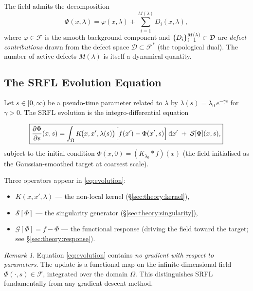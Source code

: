\documentclass[12pt,a4paper]{article}
\theoremstyle{plain}
\theoremstyle{definition}
\theoremstyle{remark}
\newtheorem{remark}[theorem]{Remark}
\newcommand{\cF}{\mathcal{F}}
\newcommand{\cD}{\mathcal{D}}
\newcommand{\cG}{\mathcal{G}}
\newcommand{\cS}{\mathcal{S}}
\newcommand{\dd}{\mathrm{d}}
\newcommand{\parti}[2]{\frac{\partial #1}{\partial #2}}
\DeclarePairedDelimiter{\set}{\{}{\}}
\begin{document}
The field admits the decomposition
\begin{equation}
  \Phi(x,\lambda) = \varphi(x,\lambda) + \sum_{i=1}^{M(\lambda)} D_i(x,\lambda),
  \label{eq:decomp}
\end{equation}
where $\varphi \in \cF$ is the smooth background component and
$\set{D_i}_{i=1}^{M(\lambda)} \subset \cD$ are \emph{defect contributions}
drawn from the defect space $\cD \subset \cF^*$ (the topological dual).
The number of active defects $M(\lambda)$ is itself a dynamical quantity.

\subsection{The SRFL Evolution Equation}
\label{sec:theory:evolution}

Let $s \in [0,\infty)$ be a pseudo-time parameter related to $\lambda$
by $\lambda(s) = \lambda_0\,e^{-\gamma s}$ for $\gamma > 0$.  The SRFL
evolution is the integro-differential equation

\begin{equation}
  \boxed{%
    \parti{\Phi}{s}(x,s)
    = \int_\Omega K\!\bigl(x,x',\lambda(s)\bigr)
      \Bigl[f(x') - \Phi(x',s)\Bigr]\,\dd x'
    \;+\; \cS[\Phi](x,s),
  }
  \label{eq:evolution}
\end{equation}
subject to the initial condition
$\Phi(x,0) = (K_{\lambda_0} * f)(x)$
(the field initialised as the Gaussian-smoothed target at coarsest scale).

Three operators appear in \eqref{eq:evolution}:

\begin{itemize}
  \item $K(x,x',\lambda)$ — the non-local kernel (\S\ref{sec:theory:kernel}),
  \item $\cS[\Phi]$ — the singularity generator (\S\ref{sec:theory:singularity}),
  \item $\cG[\Phi] = f - \Phi$ — the functional response (driving the
    field toward the target; see \S\ref{sec:theory:response}).
\end{itemize}

\begin{remark}
  Equation \eqref{eq:evolution} contains \emph{no gradient with respect
  to parameters}.  The update is a functional map on the infinite-dimensional
  field $\Phi(\cdot,s) \in \cF$, integrated over the domain $\Omega$.
  This distinguishes SRFL fundamentally from any gradient-descent method.
\end{remark}
\end{document}
